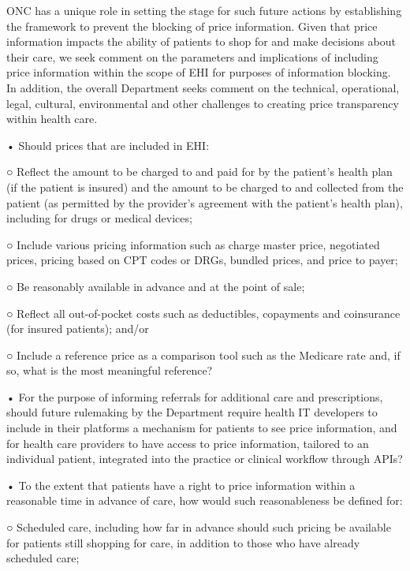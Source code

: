 \documentclass[twoside,11pt]{article}
\begin{document}
          ONC has a unique role in setting the stage for such future actions by establishing the framework to prevent the blocking of price information. Given that price information impacts the ability of patients to shop for and make decisions about their care, we seek comment on the parameters and implications of including price information within the scope of EHI for purposes of information blocking. In  \ifhmode\expandafter\xspace\fi addition, the overall Department seeks comment on the technical, operational, legal, cultural, environmental and other challenges to creating price transparency within health care.


          • Should prices that are included in EHI:


          ○ Reflect the amount to be charged to and paid for by the patient's health plan (if the patient is insured) and the amount to be charged to and collected from the patient (as permitted by the provider's agreement with the patient's health plan), including for drugs or medical devices;


          ○ Include various pricing information such as charge master price, negotiated prices, pricing based on CPT codes or DRGs, bundled prices, and price to payer;


          ○ Be reasonably available in advance and at the point of sale;


          ○ Reflect all out-of-pocket costs such as deductibles, copayments and coinsurance (for insured patients); and/or


          ○ Include a reference price as a comparison tool such as the Medicare rate and, if so, what is the most meaningful reference?


          • For the purpose of informing referrals for additional care and prescriptions, should future rulemaking by the Department require health IT developers to include in their platforms a mechanism for patients to see price information, and for health care providers to have access to price information, tailored to an individual patient, integrated into the practice or clinical workflow through APIs?


          • To the extent that patients have a right to price information within a reasonable time in advance of care, how would such reasonableness be defined for:


          ○ Scheduled care, including how far in advance should such pricing be available for patients still shopping for care, in addition to those who have already scheduled care;
\end{document}
